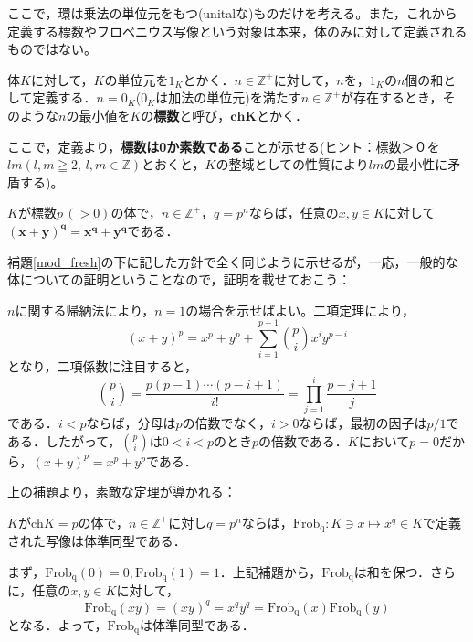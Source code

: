 ここで，環は乗法の単位元をもつ(unitalな)ものだけを考える。また，これから定義する標数やフロベニウス写像という対象は本来，体のみに対して定義されるものではない。

\begin{dfn}[体の標数]\label{ch_def}
    体$K$に対して，$K$の単位元を$1_K$とかく．$n \in \mathds{Z^{+}}$に対して，$n$を，$1_K$の$n$個の和として定義する．$n=0_K$($0_K$は加法の単位元)を満たす$n \in \mathds{Z^{+}}$が存在するとき，そのような$n$の最小値を$K$の\textbf{標数}と呼び，$\mathbf{ch}\boldsymbol{K}$とかく．
\end{dfn}

ここで，定義より，\textbf{標数は0か素数である}ことが示せる(ヒント：標数＞０を$lm\left(l,m\geqq 2, \, l,m \in \mathds{Z}\right)$とおくと，$K$の整域としての性質により$lm$の最小性に矛盾する)。

\begin{lemma}[\textsf{FD}]\label{ch_fresh}
    $K$が標数$p\, (>0)$の体で，$n \in \mathds{Z^{+}}$，$q=p^n$ならば，任意の$x,y \in K$に対して$\boldsymbol{(x+y)^{q}=x^q+y^q}$である．
\end{lemma}

補題\ref{mod_fresh}の下に記した方針で全く同じように示せるが，一応，一般的な体についての証明ということなので，証明を載せておこう：

\begin{prf}
    $n$に関する帰納法により，$n=1$の場合を示せばよい。二項定理により，
    \[
    (x+y)^p=x^p+y^p+\sum_{i=1}^{p-1}\binom{p}{i}x^i y^{p-i}
    \]
    となり，二項係数に注目すると，
    \[
    \binom{p}{i}=\frac{p(p-1)\cdots(p-i+1)}{i!}=\prod_{j=1}^{i}\frac{p-j+1}{j}
    \]
    である．$i<p$ならば，分母は$p$の倍数でなく，$i>0$ならば，最初の因子は$p/1$である．したがって，$\binom{p}{i}$は$0<i<p$のとき$p$の倍数である．$K$において$p=0$だから，$(x+y)^p=x^p+y^p$である．
\end{prf}

上の補題より，素敵な定理が導かれる：

\begin{thm}
    $K$が$\mathrm{ch}K=p$の体で，$n \in \mathds{Z}^{+}$に対し$q=p^n$ならば，$\mathrm{Frob_q}:K \ni x \mapsto x^q \in K$で定義された写像は体準同型である．
\end{thm}

\begin{prf}
    まず，$\mathrm{Frob_q}(0)=0,\mathrm{Frob_q}(1)=1$．上記補題から，$\mathrm{Frob_q}$は和を保つ．さらに，任意の$x,y \in K$に対して，
    \[
    \mathrm{Frob_q}(xy)=(xy)^q=x^q y^q=\mathrm{Frob_q}(x)\mathrm{Frob_q}(y)
    \]
    となる．よって，$\mathrm{Frob_q}$は体準同型である．
\end{prf}

